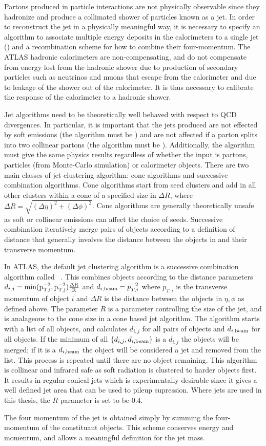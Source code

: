 Partons produced in particle interactions are not physically observable since
they hadronize and produce a collimated shower of particles known as a jet. In
order to reconstruct the jet in a physically meaningful way, it is necessary to
specify an algorithm to associate multiple energy deposits in the calorimeters
to a single jet () and a recombination scheme for how to combine their
four-momentum. The ATLAS hadronic calorimeters are non-compensating, and do not
compensate from energy lost from the hadronic shower due to production of
secondary particles such as neutrinos and muons that escape from the calorimeter
and due to leakage of the shower out of the calorimeter. It is thus necessary to
calibrate the response of the calorimeter to a hadronic shower.

Jet algorithms need to be theoretically well behaved with respect to QCD
divergences. In particular, it is important that the jets produced are not
effected by soft emissions (the algorithm must be ) and
are not affected if a parton splits into two collinear partons (the algorithm
must be ). Additionally, the algorithm must give the same
physics results regardless of whether the input is partons, particles (from
Monte-Carlo simulation) or calorimeter objects. There are two main classes of
jet clustering algorithm: cone algorithms and successive combination algorithms.
Cone algorithms start from seed clusters and add in all other clusters within a
cone of a specified size in $\Delta R$, where $\Delta R = \sqrt{(\Delta \eta)^{2} + (\Delta
\phi)^{2}} $. Cone algorithms are generally theoretically unsafe as soft or
collinear emissions can affect the choice of seeds. Successive combination
iteratively merge pairs of objects according to a definition of distance that
generally involves the distance between the objects in and their transverse
momentum.

In ATLAS, the default jet clustering algorithm is a successive combination
algorithm called \antikt~\cite{1126-6708-2008-04-063}. This combines objects
according to the distance parameters $d_{i,j} =
\rm{min}(p_{T,i}^{-2},p_{T,j}^{-2}) \frac{ \Delta R }{R}$ and $d_{i,\rm{beam}} =
p_{T,i}^{-2}$ where $p_{T,i}$ is the transverse momentum of object $i$ and
$\Delta R$ is the distance between the objects in $\eta, \phi$ as defined above.
The parameter $R$ is a parameter controlling the size of the jet, and is
analageous to the cone size in a cone based jet algorithm. The algorithm starts
with a list of all objects, and calculates $d_{i,j}$ for all pairs of objects and
$d_{i,{\rm beam}}$ for all objects. If the minimum of all $\{ d_{i,j}, d_{i,{\rm
beam}} \}$ is a  $d_{i,j}$ the objects will be merged; if it is a $ d_{i,{\rm
beam}}$ the object will be considered a jet and removed from the list. This
process is repeated until there are no object remaining. This algorithm is
collinear and infrared safe as soft radiation is clustered to harder objects
first. It results in regular conical jets which is experimentally desirable
since it gives a well defined jet area that can be used to pileup supression.
Where jets are used in this thesis, the $R$ parameter is set to be 0.4.

The four momentum of the jet is obtained simply by summing the four-momentum of
the constituant objects. This scheme conserves energy and momentum, and allows a
meaningful definition for the jet mass.

